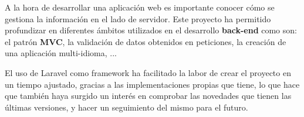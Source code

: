 \documentclass{\ClassPath/viu-tfm-template}
\begin{document}
A la hora de desarrollar una aplicación web es importante conocer cómo se gestiona la información en el lado de servidor. Este proyecto ha permitido profundizar en diferentes ámbitos utilizados en el desarrollo \textbf{back-end} como son: el patrón \textbf{MVC}, la validación de datos obtenidos en peticiones, la creación de una aplicación multi-idioma, ...

El uso de Laravel como framework ha facilitado la labor de crear el proyecto en un tiempo ajustado, gracias a las implementaciones propias que tiene, lo que hace que también haya surgido un interés en comprobar las novedades que tienen las últimas versiones, y hacer un seguimiento del mismo para el futuro.
\end{document}
